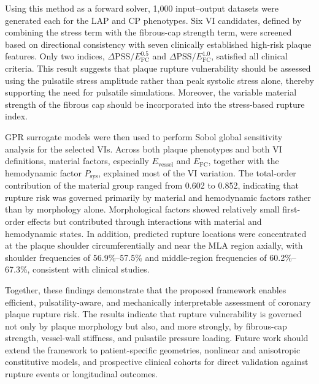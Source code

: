 \documentclass[master,english,final]{kaist-ucs}
\begin{document}
Using this method as a forward solver, 1{,}000 input--output datasets were generated each for the LAP and CP phenotypes. Six VI candidates, defined by combining the stress term with the fibrous-cap strength term, were screened based on directional consistency with seven clinically established high-risk plaque features. Only two indices, $\Delta\mathrm{PSS}/E_\mathrm{FC}^{0.5}$ and $\Delta\mathrm{PSS}/E_\mathrm{FC}^{1.0}$, satisfied all clinical criteria. This result suggests that plaque rupture vulnerability should be assessed using the pulsatile stress amplitude rather than peak systolic stress alone, thereby supporting the need for pulsatile simulations. Moreover, the variable material strength of the fibrous cap should be incorporated into the stress-based rupture index.

GPR surrogate models were then used to perform Sobol global sensitivity analysis for the selected VIs. Across both plaque phenotypes and both VI definitions, material factors, especially $E_\mathrm{vessel}$ and $E_\mathrm{FC}$, together with the hemodynamic factor $P_\mathrm{sys}$, explained most of the VI variation. The total-order contribution of the material group ranged from 0.602 to 0.852, indicating that rupture risk was governed primarily by material and hemodynamic factors rather than by morphology alone. Morphological factors showed relatively small first-order effects but contributed through interactions with material and hemodynamic states. In addition, predicted rupture locations were concentrated at the plaque shoulder circumferentially and near the MLA region axially, with shoulder frequencies of 56.9\%--57.5\% and middle-region frequencies of 60.2\%--67.3\%, consistent with clinical studies.

Together, these findings demonstrate that the proposed framework enables efficient, pulsatility-aware, and mechanically interpretable assessment of coronary plaque rupture risk. The results indicate that rupture vulnerability is governed not only by plaque morphology but also, and more strongly, by fibrous-cap strength, vessel-wall stiffness, and pulsatile pressure loading. Future work should extend the framework to patient-specific geometries, nonlinear and anisotropic constitutive models, and prospective clinical cohorts for direct validation against rupture events or longitudinal outcomes.


\appendix
\end{document}
